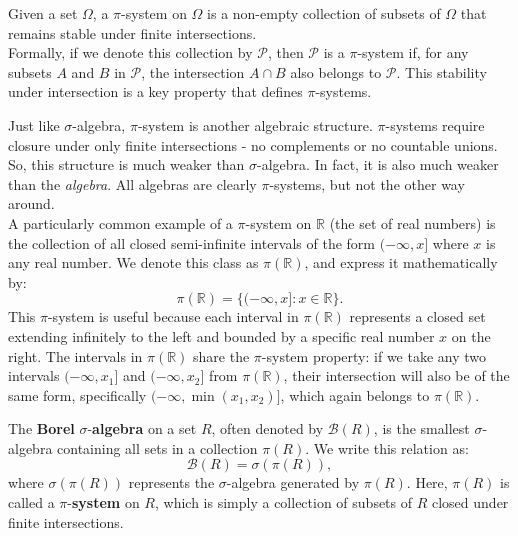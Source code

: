 \begin{definition}
    Given a set \(\Omega\), a \(\pi\)-system on \(\Omega\) is a non-empty collection of subsets of \(\Omega\) that remains stable under finite intersections. \\
    
    Formally, if we denote this collection by \(\mathcal{P}\), then \(\mathcal{P}\) is a \(\pi\)-system if, for any subsets \(A\) and \(B\) in \(\mathcal{P}\), the intersection \(A \cap B\) also belongs to \(\mathcal{P}\). This stability under intersection is a key property that defines \(\pi\)-systems.
\end{definition}

Just like $\sigma$-algebra, $\pi$-system is another algebraic structure. $\pi$-systems require closure under only finite intersections - no complements or no countable unions. So, this structure is much weaker than $\sigma$-algebra. In fact, it is also much weaker than the \textit{algebra}. All algebras are clearly $\pi$-systems, but not the other way around.\\

A particularly common example of a \(\pi\)-system on \(\mathbb{R}\) (the set of real numbers) is the collection of all closed semi-infinite intervals of the form \((-\infty, x]\) where \(x\) is any real number. We denote this class as \(\pi(\mathbb{R})\), and express it mathematically by:
\[
\pi(\mathbb{R}) = \{ (-\infty, x] : x \in \mathbb{R} \}.
\]
This \(\pi\)-system is useful because each interval in \(\pi(\mathbb{R})\) represents a closed set extending infinitely to the left and bounded by a specific real number \(x\) on the right. The intervals in \(\pi(\mathbb{R})\) share the \(\pi\)-system property: if we take any two intervals \((-\infty, x_1]\) and \((-\infty, x_2]\) from \(\pi(\mathbb{R})\), their intersection will also be of the same form, specifically \((-\infty, \min(x_1, x_2)]\), which again belongs to \(\pi(\mathbb{R})\).\\

\begin{lemma}
    The \textbf{Borel} $\sigma$-\textbf{algebra} on a set $R$, often denoted by $\mathcal{B}(R)$, is the smallest $\sigma$-algebra containing all sets in a collection $\pi(R)$. We write this relation as:
\[
\mathcal{B}(R) = \sigma(\pi(R)),
\]
where $\sigma(\pi(R))$ represents the $\sigma$-algebra generated by $\pi(R)$. Here, $\pi(R)$ is called a $\pi$-\textbf{system} on $R$, which is simply a collection of subsets of $R$ closed under finite intersections. 
\end{lemma}

